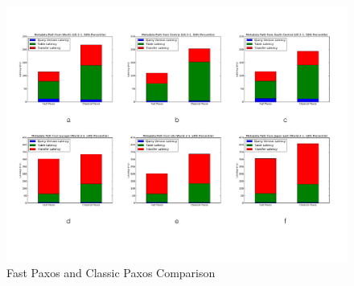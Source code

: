 \begin{figure}[t]
      \includegraphics[width=\linewidth]{images/Metadata_vs}
      \caption{Fast Paxos and Classic Paxos Comparison}
      \label{fig:metadata}
\end{figure}